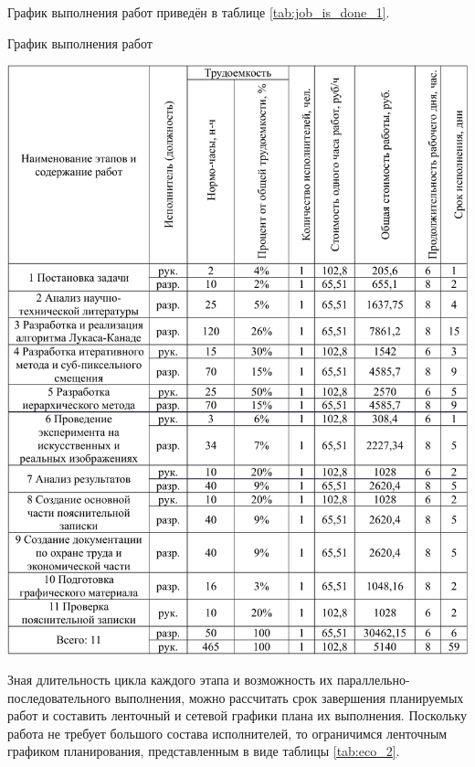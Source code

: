 График выполнения работ приведён в таблице \ref{tab:job_is_done_1}.

\begin{table}[!ht]
\caption{График выполнения работ}
\centering
\includegraphics[page=1, width=1\linewidth]{econom_table.pdf}
\label{tab:job_is_done_1}
\end{table}

Зная длительность цикла каждого этапа и возможность их параллельно-последовательного выполнения, можно рассчитать срок завершения планируемых работ и составить ленточный и сетевой графики плана их выполнения. Поскольку работа не требует большого состава исполнителей, то ограничимся ленточным графиком планирования, представленным в виде таблицы \ref{tab:eco_2}.

